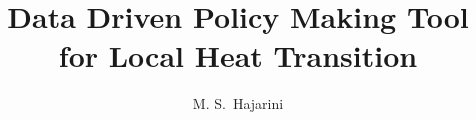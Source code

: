 \documentclass{tudelft-report}
\begin{document}
\frontmatter

\title[a case study into the linkage of technical and social domain]{Data Driven Policy Making Tool for Local Heat Transition}
\author{M. S.\ Hajarini}
\makecover


%

\mainmatter


%
%
%

\appendix



\end{document}
